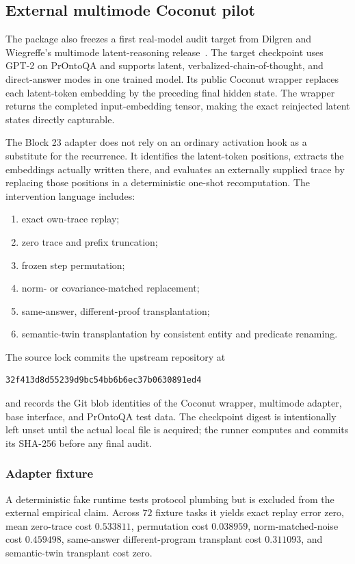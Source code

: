 \subsection{External multimode Coconut pilot}

The package also freezes a first real-model audit target from Dilgren and Wiegreffe's multimode latent-reasoning release~\cite{DILGREN2026}.  The target checkpoint uses GPT-2 on PrOntoQA and supports latent, verbalized-chain-of-thought, and direct-answer modes in one trained model.  Its public Coconut wrapper replaces each latent-token embedding by the preceding final hidden state.  The wrapper returns the completed input-embedding tensor, making the exact reinjected latent states directly capturable.

The Block 23 adapter does not rely on an ordinary activation hook as a substitute for the recurrence.  It identifies the latent-token positions, extracts the embeddings actually written there, and evaluates an externally supplied trace by replacing those positions in a deterministic one-shot recomputation.  The intervention language includes:
\begin{enumerate}
\item exact own-trace replay;
\item zero trace and prefix truncation;
\item frozen step permutation;
\item norm- or covariance-matched replacement;
\item same-answer, different-proof transplantation;
\item semantic-twin transplantation by consistent entity and predicate renaming.
\end{enumerate}

The source lock commits the upstream repository at
\begin{verbatim}
32f413d8d55239d9bc54bb6b6ec37b0630891ed4
\end{verbatim}
and records the Git blob identities of the Coconut wrapper, multimode adapter, base interface, and PrOntoQA test data.  The checkpoint digest is intentionally left unset until the actual local file is acquired; the runner computes and commits its SHA-256 before any final audit.

\subsubsection{Adapter fixture}

A deterministic fake runtime tests protocol plumbing but is excluded from the external empirical claim.  Across $72$ fixture tasks it yields exact replay error zero, mean zero-trace cost $0.533811$, permutation cost $0.038959$, norm-matched-noise cost $0.459498$, same-answer different-program transplant cost $0.311093$, and semantic-twin transplant cost zero.

